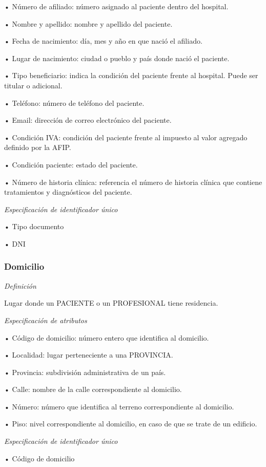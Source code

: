 \documentclass[a4paper,11pt]{article}
\begin{document}
• Número de afiliado: número asignado al paciente dentro del hospital.

• Nombre y apellido: nombre y apellido del paciente.

• Fecha de nacimiento: día, mes y año en que nació el afiliado.

• Lugar de nacimiento: ciudad o pueblo y país donde nació el paciente.

• Tipo beneficiario: indica la condición del paciente frente al hospital. Puede 
ser titular o adicional.

• Teléfono: número de teléfono del paciente.

• Email: dirección de correo electrónico del paciente.

• Condición IVA: condición del paciente frente al impuesto al valor agregado 
definido por la AFIP.

• Condición paciente: estado del paciente.

• Número de historia clínica: referencia el número de historia clínica que 
contiene tratamientos y diagnósticos del paciente.

\textit{Especificación de identificador único}

• Tipo documento

• DNI\label{HToc293405807}

\subsubsection{\textbf{Domicilio}}

\textit{Definición}

Lugar donde un PACIENTE o un PROFESIONAL tiene residencia.

\textit{Especificación de atributos}

• Código de domicilio: número entero que identifica al domicilio.

• Localidad: lugar perteneciente a una PROVINCIA.

• Provincia: subdivisión administrativa de un país.

• Calle: nombre de la calle correspondiente al domicilio.

• Número: número que identifica al terreno correspondiente al domicilio.

• Piso: nivel correspondiente al domicilio, en caso de que se trate de un edificio.

\textit{Especificación de identificador único}

• Código de domicilio\label{HToc293405808}
\end{document}
